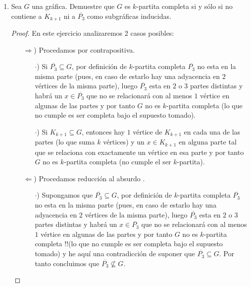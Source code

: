 \documentclass{article}
\begin{document}
\begin{enumerate}
\item Sea $G$ una gr\'afica.   Demuestre que $G$ es $k$-partita completa si y
  s\'olo si no contiene a $K_{k+1}$ ni a $\overline{P_3}$ como subgr\'aficas
  inducidas.
  \renewcommand\qedsymbol{QED}
  \begin{proof}
    En este ejercicio analizaremos 2 casos posibles:
    
    \begin{itemize}
    \item[$\Rightarrow$)] Procedamos por contrapositiva.

      \begin{itemize}
      \item[$\cdot$)] Si $\overline{P_3} \subseteq G$, por definición
        de $k$-partita completa $\overline{P_3}$ no esta en la misma
        parte (pues, en caso de estarlo hay una adyacencia en $2$ vértices
        de la misma parte), luego $\overline{P_3}$ esta en $2$ o $3$
        partes distintas y habrá un $x \in \overline{P_3}$ que no se
        relacionará con al menos $1$ vértice en algunas de las partes
        y por tanto $G$ no es $k$-partita completa (lo que no cumple es
        ser completa bajo el supuesto tomado).
        
      \item[$\cdot$)] Si $K_{k + 1} \subseteq G$, entonces hay $1$ vértice
        de $K_{k + 1}$ en cada una de las partes (lo que suma $k$ v\'ertices) y un
        $x \in K_{k + 1}$ en alguna parte tal que se relaciona con exactamente
        un v\'ertice en esa parte y por tanto $G$ no es $k$-partita completa
        (no cumple el ser $k$-partita).
      \end{itemize}
    \item[$\Leftarrow$)] Procedamos reducción al absurdo .
      
      \begin{itemize}
      \item[$\cdot$)] Supongamos que $\overline{P_3} \subseteq G$, por
        definición de $k$-partita completa $\overline{P_3}$ no esta en
        la misma parte (pues, en caso de estarlo hay una adyacencia en
        $2$ vértices de la misma parte), luego $\overline{P_3}$ esta en
        $2$ o $3$ partes distintas y habrá un $x \in \overline{P_3}$ que
        no se relacionará con al menos $1$ vértice en algunas de las partes
        y por tanto $G$ no es $k$-partita completa !!(lo que no cumple es
        ser completa bajo el supuesto tomado) y he aquí una contradicción
        de suponer que $\overline{P_3} \subseteq G$. Por tanto concluimos
        que $\overline{P_3} \nsubseteq G$.
        

\end{itemize}
\end{itemize}
\end{proof}
\end{enumerate}
\end{document}
